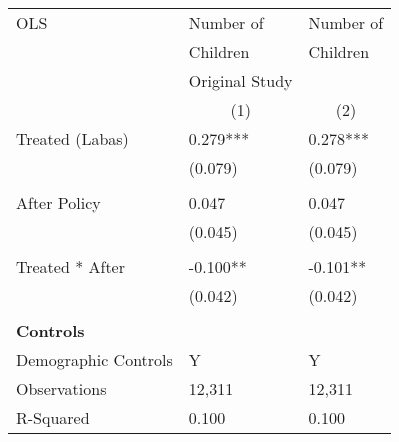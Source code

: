 \begin{tabular}{p{4cm}p{1.5cm}p{1.5cm}}
\hline\hline
OLS               &Number of & Number of \\
&Children & Children \\
&Original Study &  \\
&\multicolumn{1}{c}{(1)}&\multicolumn{1}{c}{(2)}\\
\hline
Treated (Labas)   &   0.279***&   0.278***\\
                &  (0.079)&  (0.079)\\
                \\
After Policy   &   0.047&   0.047\\
                &  (0.045)&  (0.045)\\
                \\
Treated * After   &  -0.100**&  -0.101**\\
                &  (0.042)&  (0.042)\\
                \\

\multicolumn{6}{l}{\textbf{Controls}}  \\                  
Demographic Controls       &    Y     &        Y\\

\hline
Observations    &    12,311&    12,311\\
R-Squared    &  0.100   & 0.100     \\
\hline\hline
\end{tabular}
